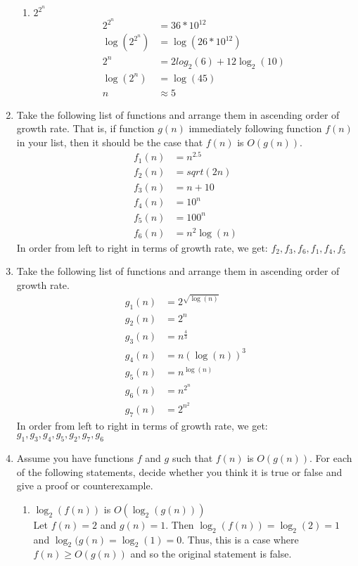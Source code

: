 \documentclass[12pt]{article}
\begin{document}
\begin{enumerate}
\begin{enumerate}
	\item $2^{2^n}$\\
	\begin{align*}
	2^{2^n} &= 36*10^{12}\\
	\log(2^{2^n}) &= \log(26*10^{12})\\
	2^n &= 2log_2(6)+12\log_2(10)\\
	\log(2^n) &= \log(45)\\
	n &\approx 5
	\end{align*}
	
	\end{enumerate}
\item Take the following list of functions and arrange them in ascending order of growth rate. That is, if function $g(n)$ immediately following function $f(n)$ in your list, then it should be the case that $f(n)$ is $O(g(n))$.
	\begin{align*}
	f_1(n) &= n^{2.5}\\
	f_2(n) &= sqrt(2n)\\
	f_3(n) &= n + 10\\
	f_4(n) &= 10^n\\
	f_5(n) &= 100^n\\
	f_6(n) &= n^2\log(n)
	\end{align*}
	In order from left to right in terms of growth rate, we get: $f_2,f_3,f_6,f_1,f_4,f_5$
	
\item Take the following list of functions and arrange them in ascending order of growth rate.
	\begin{align*}
	g_1(n) &= 2^{\sqrt{\log(n)}}\\
	g_2(n) &= 2^n\\
	g_3(n) &= n^{\frac{4}{3}}\\
	g_4(n) &= n(\log(n))^3\\
	g_5(n) &= n^{\log(n)}\\
	g_6(n) &= n^{2^n}\\
	g_7(n) &= 2^{n^2}
	\end{align*}
	In order from left to right in terms of growth rate, we get: $g_1,g_3,g_4,g_5,g_2,g_7,g_6$

\item Assume you have functions $f$ and $g$ such that $f(n)$ is $O(g(n))$. For each of the following statements, decide whether you think it is true or false and give a proof or counterexample.
	\begin{enumerate}
	\item $\log_2(f(n))$ is $O(\log_2(g(n)))$\\
	Let $f(n)=2$ and $g(n)=1$. Then $\log_2(f(n))=\log_2(2) = 1$ and $\log_2(g(n) = \log_2(1) = 0$. Thus, this is a case where $f(n) \geq O(g(n))$ and so the original statement is false. 
	

\end{enumerate}
\end{enumerate}
\end{document}
